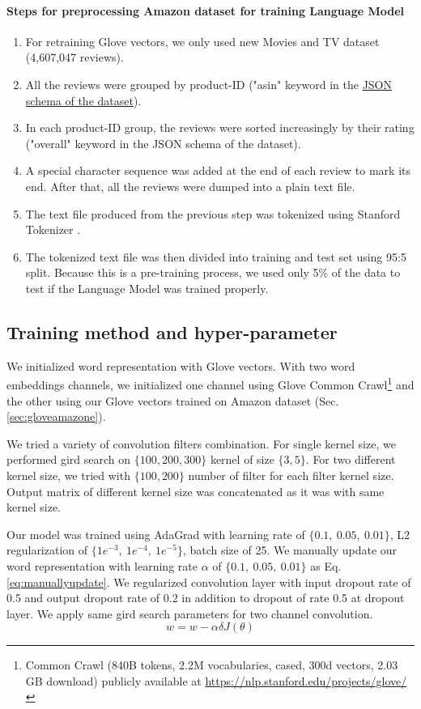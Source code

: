 \paragraph{Steps for preprocessing Amazon dataset for training Language Model}
\label{sec:preprocessamazonglove-LM}
\begin{enumerate}
\item For retraining Glove vectors, we only used new Movies and TV dataset (4,607,047 reviews)\cite{McAuleyTSH15}\cite{HeM16}.
\item All the reviews were grouped by product-ID ("asin" keyword in the \hyperref[sec:amazon]{JSON schema of the dataset}). 
\item In each product-ID group, the reviews were sorted increasingly by their rating ("overall" keyword in the JSON schema of the dataset).
\item A special character sequence was added at the end of each review to mark its end.
After that, all the reviews were dumped into a plain text file.
\item The text file produced from the previous step was tokenized using Stanford Tokenizer \cite{tokenizerpart}. 
\item The tokenized text file was then divided into training and test set using 95:5 split.
Because this is a pre-training process, we used only 5\% of the data to test if the Language Model was trained properly.
\end{enumerate}

\subsection{Training method and hyper-parameter}
We initialized word representation with Glove vectors\cite{glove}. 
With two word embeddings channels, we initialized one channel using Glove Common Crawl\footnote{\label{glovecommoncrawl}Common Crawl (840B tokens, 2.2M vocabularies, cased, 300d vectors, 2.03 GB download) publicly available at \url{https://nlp.stanford.edu/projects/glove/}} and the other using our Glove vectors trained on Amazon dataset (Sec.\ref{sec:gloveamazone}). 

We tried a variety of convolution filters combination. For single kernel size, we performed gird search on $\{100, 200, 300\}$ kernel of size $\{3, 5\}$. For two different kernel size, we tried with $\{100, 200\}$ number of filter for each filter kernel size. Output matrix of different kernel size was concatenated as it was with same kernel size. 

Our model was trained using AdaGrad \cite{duchi2011adaptive} with learning rate of $\{0.1,~ 0.05,~ 0.01\}$, L2 regularization of $\{1e^{-3},~ 1e^{-4}, ~ 1e^{-5} \}$, batch size of 25. We manually update our word representation with learning rate $\alpha$ of $\{0.1,~0.05, ~0.01\}$ as Eq.\ref{eq:manuallyupdate}. We regularized convolution layer with input dropout rate of 0.5 and output dropout rate of 0.2 in addition to dropout of rate 0.5 at dropout layer. 
We apply same gird search parameters for two channel convolution. 
\begin{equation}
\label{eq:manuallyupdate}
w = w - \alpha\delta J(\theta)
\end{equation}

